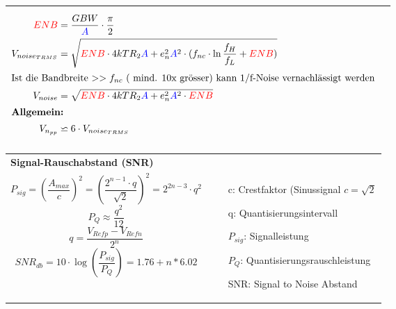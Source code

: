 \begin{longtable}[t]{|p{4cm}|p{13.8cm}|}
{       \begin{align*}
           \textcolor{red}{ENB} &=\frac{GBW}{\textcolor{blue}{A}} \cdot \frac{\pi}{2} \\
           V_{noise_{TRMS}} &= \sqrt{\textcolor{red}{ENB} \cdot 4kTR_2 \textcolor{blue}{A}+e_n^2 \textcolor{blue}{A}^2\cdot (f_{nc}\cdot \ln{\frac{f_{H}}{f_{L}}}+\textcolor{red}{ENB})}\\
           \intertext{Ist die Bandbreite $>>f_{nc}$ ( mind. 10x grösser) kann 1/f-Noise vernachlässigt werden}
           V_{noise} &= \sqrt{\textcolor{red}{ENB} \cdot 4kTR_{2}\textcolor{blue}{A} +e_n^2 \textcolor{blue}{A}^2 \cdot \textcolor{red}{ENB}}\\
           \intertext{\bf Allgemein:}
           V_{n_{pp}} &\backsimeq 6 \cdot V_{noise_{TRMS}}
       \end{align*} 
    }
    \\ \hline
\end{longtable}


\vspace{-2.5\topsep}
\begin{longtable}[t]{|p{9cm}|p{9cm}|}
  \hline  
    \multicolumn{2}{|l|}{\bf Signal-Rauschabstand (SNR)} \\
  \hdashline
    \vspace{-1.5\topsep}
    \[ P_{sig} = \left(\frac{A_{max}}{c}\right)^2=\left(\frac{2^{n-1}\cdot q}{\sqrt 2}\right)^2 = 2^{2n-3}\cdot q^2\]    
    \newline
    \[ P_Q \approx \frac{q^2}{12} \] \newline
    \[ q = \frac{V_{Refp}-V_{Refn}}{2^n} \]  \newline
    \[ SNR_{db} = 10 \cdot \log\left(\frac{P_{sig}}{P_Q}\right) = 1.76+n*6.02 \] &
    \vspace{-1.5\topsep}
    \begin{itemize}
      \item[c:] Crestfaktor (Sinussignal $c=\sqrt 2$
      \item[q:] Quantisierungsintervall
      \item[$P_{sig}$:] Signalleistung
      \item[$P_Q$:] Quantisierungsrauschleistung
      \item[SNR:] Signal to Noise Abstand
    \end{itemize} \\
  \hline
\end{longtable}
    
    
    